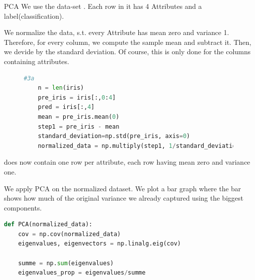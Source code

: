 \begin{task}[]{PCA}
 We use the data-set . Each row in it has 4 Attributes and a label(classification).
 \begin{subtask}
 	We normalize the data, s.t. every Attribute has mean zero and variance 1. Therefore, for every column, we compute the sample mean and subtract it. Then, we devide by the standard deviation. Of course, this is only done for the columns containing attributes.
 	\begin{figure}[H]
 		\begin{lstlisting}[language=python]
	#3a
	n = len(iris)
	pre_iris = iris[:,0:4]
	pred = iris[:,4]
	mean = pre_iris.mean(0)
	step1 = pre_iris - mean
	standard_deviation=np.std(pre_iris, axis=0)
	normalized_data = np.multiply(step1, 1/standard_deviation).T   
 		\end{lstlisting}
 	\end{figure}
	 does now contain one row per attribute, each row having mean zero and variance one.
\end{subtask}
\begin{subtask}
	We apply PCA on the normalized dataset. We plot a bar graph where the  bar shows how much of the original variance we already captured using the biggest  components.
\begin{lstlisting}[language=python]
def PCA(normalized_data):
	cov = np.cov(normalized_data)
	eigenvalues, eigenvectors = np.linalg.eig(cov)
	
	summe = np.sum(eigenvalues)
	eigenvalues_prop = eigenvalues/summe
	

\end{lstlisting}
\end{subtask}
\end{task}
